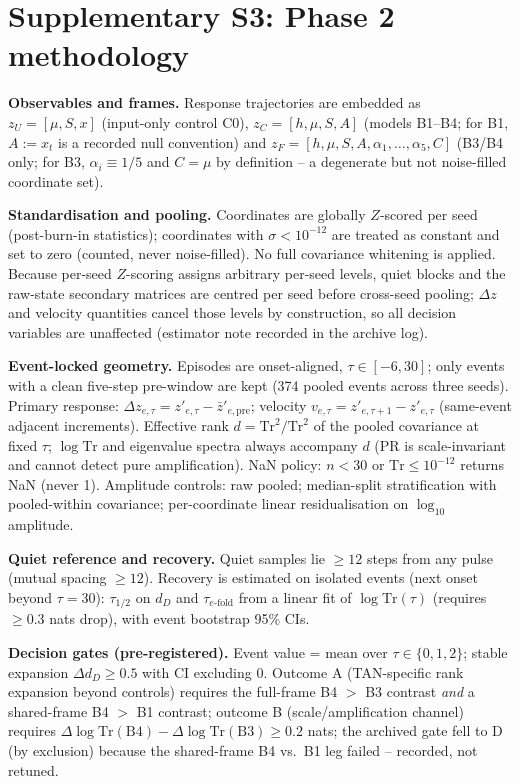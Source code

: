 \section{Supplementary S3: Phase 2 methodology}

\textbf{Observables and frames.} Response trajectories are embedded as
$z_U = [\mu, S, x]$ (input-only control C0), $z_C = [h,\mu,S,A]$
(models B1--B4; for B1, $A:=x_t$ is a recorded null convention) and
$z_F = [h,\mu,S,A,\alpha_1,\dots,\alpha_5,C]$ (B3/B4 only; for B3,
$\alpha_i \equiv 1/5$ and $C = \mu$ by definition -- a degenerate but
not noise-filled coordinate set).

\textbf{Standardisation and pooling.} Coordinates are globally
$Z$-scored per seed (post-burn-in statistics); coordinates with
$\sigma < 10^{-12}$ are treated as constant and set to zero (counted,
never noise-filled).  No full covariance whitening is applied.  Because
per-seed $Z$-scoring assigns arbitrary per-seed levels, quiet blocks and
the raw-state secondary matrices are centred per seed before cross-seed
pooling; $\Delta z$ and velocity quantities cancel those levels by
construction, so all decision variables are unaffected (estimator note
recorded in the archive log).

\textbf{Event-locked geometry.} Episodes are onset-aligned,
$\tau \in [-6,30]$; only events with a clean five-step pre-window are
kept (374 pooled events across three seeds).  Primary response:
$\Delta z_{e,\tau} = z'_{e,\tau} - \bar z'_{e,\mathrm{pre}}$;
velocity $v_{e,\tau} = z'_{e,\tau+1}-z'_{e,\tau}$ (same-event adjacent
increments).  Effective rank $d = \mathrm{Tr}^2/\mathrm{Tr}^2$ of the
pooled covariance at fixed $\tau$; $\log\mathrm{Tr}$ and eigenvalue
spectra always accompany $d$ (PR is scale-invariant and cannot detect
pure amplification).  NaN policy: $n < 30$ or
$\mathrm{Tr} \le 10^{-12}$ returns NaN (never 1).  Amplitude controls:
raw pooled; median-split stratification with pooled-within covariance;
per-coordinate linear residualisation on $\log_{10}$ amplitude.

\textbf{Quiet reference and recovery.} Quiet samples lie $\geq 12$
steps from any pulse (mutual spacing $\geq 12$).  Recovery is estimated
on isolated events (next onset beyond $\tau = 30$): $\tau_{1/2}$ on
$d_D$ and $\tau_{e\text{-fold}}$ from a linear fit of
$\log\mathrm{Tr}(\tau)$ (requires $\geq 0.3$ nats drop), with event
bootstrap 95\% CIs.

\textbf{Decision gates (pre-registered).} Event value = mean over
$\tau \in \{0,1,2\}$; stable expansion $\Delta d_D \geq 0.5$ with CI
excluding 0.  Outcome A (TAN-specific rank expansion beyond controls)
requires the full-frame B4 $>$ B3 contrast \emph{and} a shared-frame
B4 $>$ B1 contrast; outcome B (scale/amplification channel) requires
$\Delta\log\mathrm{Tr}(\mathrm{B4}) - \Delta\log\mathrm{Tr}(\mathrm{B3})
\geq 0.2$ nats; the archived gate fell to D (by exclusion) because the
shared-frame B4 vs.\ B1 leg failed -- recorded, not retuned.
